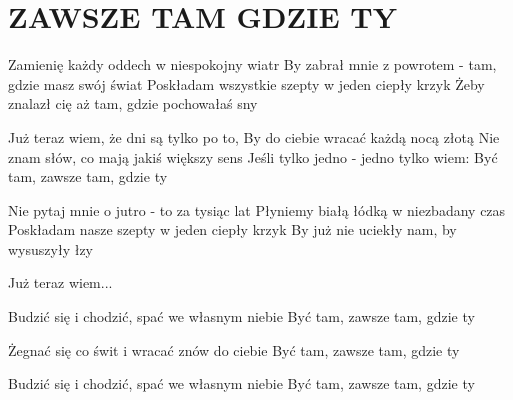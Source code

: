 \documentclass[../../../songbook.tex]{subfiles}
\begin{document}
\TabPositions{8cm} %
\section*{ZAWSZE TAM GDZIE TY}
{}
\vspace{1.5cm}
Zamienię każdy oddech w niespokojny wiatr				 \newline
By zabrał mnie z powrotem - tam, gdzie masz swój świat   \newline
Poskładam wszystkie szepty w jeden ciepły krzyk  \newline
Żeby znalazł cię aż tam, gdzie pochowałaś sny \newline

\-\hspace{1cm} Już teraz wiem, że dni są tylko po to,		 \newline
\-\hspace{1cm} By do ciebie wracać każdą nocą złotą		 \newline
\-\hspace{1cm} Nie znam słów, co mają jakiś większy sens \newline
\-\hspace{1cm} Jeśli tylko jedno - jedno tylko wiem: \newline
\-\hspace{1cm} Być tam, zawsze tam, gdzie ty \newline

Nie pytaj mnie o jutro - to za tysiąc lat \newline
Płyniemy białą łódką w niezbadany czas \newline
Poskładam nasze szepty w jeden ciepły krzyk \newline
By już nie uciekły nam, by wysuszyły łzy \newline

\-\hspace{1cm} Już teraz wiem... \newline

Budzić się i chodzić, spać we własnym niebie	 \newline
Być tam, zawsze tam, gdzie ty					 \newline

Żegnać się co świt i wracać znów do ciebie \newline
Być tam, zawsze tam, gdzie ty \newline

Budzić się i chodzić, spać we własnym niebie \newline
Być tam, zawsze tam, gdzie ty \newline
\end{document}
